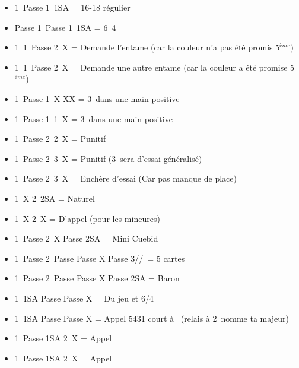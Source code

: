 \documentclass[a4paper, oneside, 11pt]{report}
\begin{document}
\newpage
	\begin{itemize}
	\item 1\trefle\ Passe 1\pique\ 1SA = 16-18 régulier
	\item Passe 1\trefle\ Passe 1\pique\ 1SA = 6\carreau\ 4\coeur\\

	\item 1\trefle\ 1\pique\ Passe 2\trefle\ X = Demande l'entame (car la couleur n'a pas été promis 5$^{ème}$)
	\item 1\coeur\ 1\pique\ Passe 2\coeur\ X = Demande une autre entame (car la couleur a été promise 5$^{ème}$)\\

	\item 1\carreau\ Passe 1\coeur\ X XX = 3\coeur\ dans une main positive
	\item 1\carreau\ Passe 1\coeur\ 1\pique\ X = 3\coeur\ dans une main positive

	\item 1\coeur\ Passe 2\coeur\ 2\pique\ X = Punitif
	\item 1\coeur\ Passe 2\coeur\ 3\trefle\ X = Punitif (3\carreau\ sera d'essai généralisé)
	\item 1\coeur\ Passe 2\coeur\ 3\carreau\ X = Enchère d'essai (Car pas manque de place)\\

	\item 1\pique\ X 2\pique\ 2SA = Naturel
	\item 1\pique\ X 2\pique\ X = D'appel (pour les mineures)
	\item 1\pique\ Passe 2\pique\ X Passe 2SA = Mini Cuebid
	\item 1\pique\ Passe 2\pique\ Passe Passe X Passe 3\trefle/\carreau/\coeur\ = 5 cartes
	\item 1\pique\ Passe 2\pique\ Passe Passe X Passe 2SA = Baron\\

	\item 1\coeur\ 1SA Passe Passe X = Du jeu et 6\coeur/4\pique
	\item 1\trefle\ 1SA Passe Passe X = Appel 5431 court à \carreau\ (relais à 2\carreau\ nomme ta majeur)\\

	\item 1\pique\ Passe 1SA 2\carreau\ X = Appel
	\item 1\carreau\ Passe 1SA 2\pique\ X = Appel\\


\end{itemize}
\end{document}
